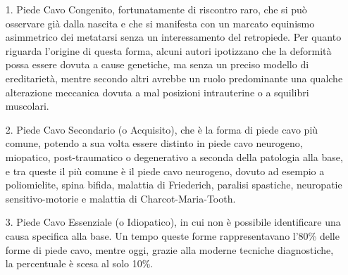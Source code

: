 \begin{itemize}
\item[1.] Piede Cavo Congenito, fortunatamente di riscontro raro, che si può osservare già dalla nascita e che si manifesta con un marcato equinismo asimmetrico dei metatarsi senza un interessamento del retropiede. Per
quanto riguarda l'origine di questa forma, alcuni autori ipotizzano che la deformità possa essere dovuta a cause genetiche, ma senza un preciso modello di ereditarietà, mentre secondo altri avrebbe un ruolo predominante una qualche alterazione meccanica dovuta a mal posizioni
intrauterine o a squilibri muscolari.

\item[2.] Piede Cavo Secondario (o Acquisito), che è la forma di piede cavo più comune, potendo a sua volta essere distinto in piede cavo neurogeno, miopatico, post-traumatico o degenerativo a seconda della patologia alla
base, e tra queste il più comune è il piede cavo neurogeno, dovuto ad esempio a poliomielite, spina bifida, malattia di Friederich, paralisi spastiche, neuropatie sensitivo-motorie e malattia di Charcot-Maria-Tooth.

\item[3.] Piede Cavo Essenziale (o Idiopatico), in cui non è possibile identificare una causa specifica alla base. Un tempo queste forme rappresentavano l'80\% delle forme di piede cavo, mentre oggi, grazie alla moderne tecniche diagnostiche, la percentuale è scesa al solo 10\%.
\end{itemize}

